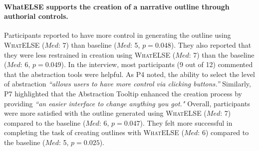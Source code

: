 
\paragraph{WhatELSE supports the creation of a narrative outline through authorial controls.} Participants reported to have more control in generating the outline using \textsc{WhatELSE} ($Med$: 7) than baseline ($Med$: 5, $p = 0.048$). They also reported that they were less restrained in creation using \textsc{WhatELSE} ($Med$: 7) than the baseline ($Med$: 6, $p = 0.049$). In the interview, most participants (9 out of 12) commented that the abstraction tools were helpful. As P4 noted, the ability to select the level of abstraction \textit{``allows users to have more control via clicking buttons.''} Similarly, P7 highlighted that the Abstraction Tooltip enhanced the creation process by providing \textit{``an easier interface to change anything you got."} Overall, participants were more satisfied with the outline generated using \textsc{WhatELSE} ($Med$: 7) compared to the baseline ($Med$: 6, $p = 0.047$). They felt more successful in completing the task of creating outlines with \textsc{WhatELSE} ($Med$: 6) compared to the baseline ($Med$: 5, $p = 0.025$). 




